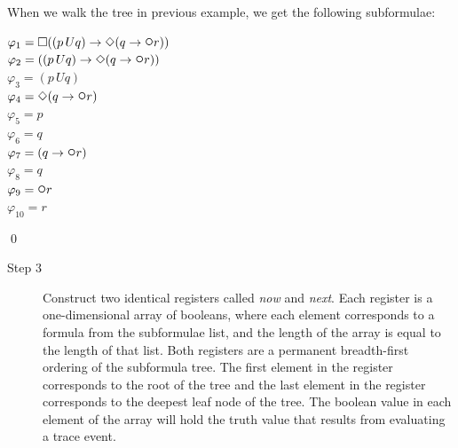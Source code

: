 \begin{myEx} When we walk the tree in previous example, we get the following subformulae:
\begin{flushleft}
$ \varphi_{1} = \LTLalways((p \,U q) \rightarrow \LTLeventually(q \rightarrow \LTLnext r)) $ \\
$ \varphi_{2} = ((p \,U q) \rightarrow \LTLeventually(q \rightarrow \LTLnext r)) $ \\
$ \varphi_{3} = (p \,U q) $ \\
$ \varphi_{4} = \LTLeventually(q \rightarrow \LTLnext r) $ \\
$ \varphi_{5} = p $ \\
$ \varphi_{6} = q $ \\
$ \varphi_{7} = (q \rightarrow \LTLnext r) $ \\
$ \varphi_{8} = q $ \\
$ \varphi_{9} = \LTLnext r $ \\
$ \varphi_{10} = r $ 
\end{flushleft}
\qed
\end{myEx}

\begin{description}
\item[Step 3] Construct two identical registers called \textit{now} and \textit{next}.  Each register is a one-dimensional array of booleans, where each element corresponds to a formula from the subformulae list, and the length of the array is equal to the length of that list.  Both registers are a permanent breadth-first ordering of the subformula tree.  The first element in the register corresponds to the root of the tree and the last element in the register corresponds to the deepest leaf node of the tree.  The boolean value in each element of the array will hold the truth value that results from evaluating a trace event.\\
\end{description}

